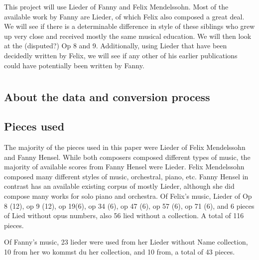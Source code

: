 \documentclass[12pt,twoside]{reedthesis}
\theoremstyle{definition}
\theoremstyle{definition}
\theoremstyle{definition}
\theoremstyle{remark}
\begin{document}
This project will use Lieder of Fanny and Felix Mendelssohn. Most of the
available work by Fanny are Lieder, of which Felix also composed a great
deal. We will see if there is a determinable difference in style of
these siblings who grew up very close and received mostly the same
musical education. We will then look at the (disputed?) Op 8 and 9.
Additionally, using Lieder that have been decidedly written by Felix, we
will see if any other of his earlier publications could have potentially
been written by Fanny.

\chapter{}\label{section-1}

\section{About the data and conversion
process}\label{about-the-data-and-conversion-process}

\section{Pieces used}\label{pieces-used}

The majority of the pieces used in this paper were Lieder of Felix
Mendelssohn and Fanny Hensel. While both composers composed different
types of music, the majority of available scores from Fanny Hensel were
Lieder. Felix Mendelssohn composed many different styles of music,
orchestral, piano, etc. Fanny Hensel in contrast has an available
existing corpus of mostly Lieder, although she did compose many works
for solo piano and orchestra. Of Felix's music, Lieder of Op 8 (12), op
9 (12), op 19(6), op 34 (6), op 47 (6), op 57 (6), op 71 (6), and 6
pieces of Lied without opus numbers, also 56 lied without a collection.
A total of 116 pieces.

Of Fanny's music, 23 lieder were used from her Lieder without Name
collection, 10 from her wo kommst du her collection, and 10 from, a
total of 43 pieces.
\end{document}
